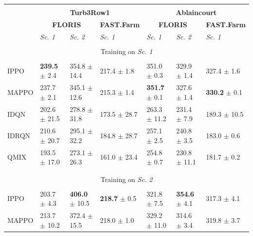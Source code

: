 \documentclass{article}
\newcommand{\ra}[1]
{\renewcommand{\arraystretch}{#1}}
\begin{document}
\begin{table}[!htb]
\ra{1.2}
\centering
\begin{tabular}{lllllll}
\multicolumn{1}{c}{} & & & & & & \\
\multicolumn{1}{c}{} & \multicolumn{3}{c}{\textbf{Turb3Row1}} & \multicolumn{3}{c}{\textbf{Ablaincourt}} \\
\hline
\multicolumn{1}{c}{}& \multicolumn{2}{c}{\textbf{FLORIS}} & \textbf{FAST.Farm}& \multicolumn{2}{c}{\textbf{FLORIS}} & \textbf{FAST.Farm}\\
\hline
& \textit{Sc. 1} & \textit{Sc. 2} & \textit{Sc. 1}  & \textit{Sc. 1} & \textit{Sc. 2} & \textit{Sc. 1}\\
\hline
& & & & & &  \\
\multicolumn{7}{c}{Training on \textit{Sc. 1}} \\
& & & & & &  \\
IPPO & \textbf{239.5} $\pm$ 2.4 & 354.8 $\pm$ 14.4 & 217.4 $\pm$ 1.8 & 351.0 $\pm$ 0.3 & 329.9 $\pm$ 1.4 & 327.4 $\pm$ 1.6 \\
 MAPPO & 237.7 $\pm$ 2.1 & 345.1 $\pm$ 12.6 & 215.3 $\pm$ 1.4 & \textbf{351.7} $\pm$ 0.1 & 327.6 $\pm$ 1.4 & \textbf{330.2} $\pm$ 0.1 \\
IDQN & 202.6 $\pm$ 21.5 & 278.8 $\pm$ 31.8 & 173.5 $\pm$ 28.7 & 263.3 $\pm$ 11.2 & 231.4 $\pm$ 7.9 & 189.3 $\pm$ 10.5 \\
IDRQN & 210.6 $\pm$ 20.7 & 295.1 $\pm$ 32.2 & 184.8 $\pm$ 28.7 & 257.1 $\pm$ 2.5 & 240.8 $\pm$ 3.5 & 183.0 $\pm$ 0.6 \\
QMIX & 193.5 $\pm$ 17.0 & 273.1 $\pm$ 26.3 & 161.0 $\pm$ 23.4 & 254.8 $\pm$ 0.7 & 230.8 $\pm$ 11.1 & 181.7 $\pm$ 0.2 \\
& & & & & & \\
\hline
& & & & & & \\
\multicolumn{7}{c}{Training on \textit{Sc. 2}} \\
& & & & & & \\
 IPPO & 203.7 $\pm$ 4.3 & \textbf{406.0} $\pm$ 10.5& \textbf{218.7} $\pm$ 0.5 & 321.8 $\pm$ 7.5 & \textbf{354.6} $\pm$ 4.1  & 317.3 $\pm$ 4.1 \\
MAPPO & 213.7 $\pm$ 10.2 & 372.4 $\pm$ 15.5 & 218.0 $\pm$ 1.0 & 329.2 $\pm$ 11.0 & 314.6 $\pm$ 3.4 & 319.8 $\pm$ 3.7 \\

\end{tabular}
\end{table}
\end{document}
